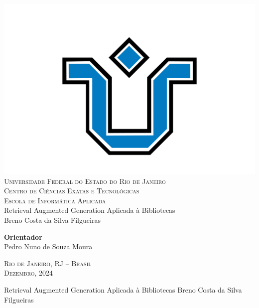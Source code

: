 \documentclass[a4paper, 12pt]{article}
\begin{document}
\setcounter{page}{1}

\thispagestyle{empty}

    \begin{center}
        \includegraphics[scale=0.18]{unirio.png}\\
        \fontsize{13}{15}
        \textsc{
            Universidade Federal do Estado do Rio de Janeiro\\
            Centro de Ciências Exatas e Tecnológicas\\
            Escola de Informática Aplicada\\
        }
        \vspace{2.8cm}
        Retrieval Augmented Generation Aplicada à Bibliotecas\\
        \vspace{2.8cm}
        Breno Costa da Silva Filgueiras
        \vspace{2.8cm}

        \begin{flushright}
            \textbf{Orientador}\\
            Pedro Nuno de Souza Moura
        \end{flushright}

        \vspace*{\fill}
        
        \textsc{Rio de Janeiro, RJ -- Brasil\\ Dezembro, 2024}
    \end{center}

    \clearpage

    \begin{center}
        Retrieval Augmented Generation Aplicada à Bibliotecas
        \vskip 0.5cm
        Breno Costa da Silva Filgueiras
        \vskip 2.0cm
    \end{center}
\end{document}
